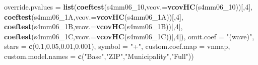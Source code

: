 \documentclass[
]{article}
\newenvironment{Shaded}{\begin{snugshade}}{\end{snugshade}}
\newcommand{\DataTypeTok}[1]{\textcolor[rgb]{0.13,0.29,0.53}{#1}}
\newcommand{\DecValTok}[1]{\textcolor[rgb]{0.00,0.00,0.81}{#1}}
\newcommand{\FloatTok}[1]{\textcolor[rgb]{0.00,0.00,0.81}{#1}}
\newcommand{\KeywordTok}[1]{\textcolor[rgb]{0.13,0.29,0.53}{\textbf{#1}}}
\newcommand{\NormalTok}[1]{#1}
\newcommand{\StringTok}[1]{\textcolor[rgb]{0.31,0.60,0.02}{#1}}
\begin{document}
\begin{Shaded}
\begin{Highlighting}[]
          \DataTypeTok{override.pvalues =} \KeywordTok{list}\NormalTok{(}\KeywordTok{coeftest}\NormalTok{(s4mm06_}\DecValTok{10}\NormalTok{,}\DataTypeTok{vcov.=}\KeywordTok{vcovHC}\NormalTok{(s4mm06_}\DecValTok{10}\NormalTok{))[,}\DecValTok{4}\NormalTok{],}
                                  \KeywordTok{coeftest}\NormalTok{(s4mm06_1A,}\DataTypeTok{vcov.=}\KeywordTok{vcovHC}\NormalTok{(s4mm06_1A))[,}\DecValTok{4}\NormalTok{],}
                                  \KeywordTok{coeftest}\NormalTok{(s4mm06_1B,}\DataTypeTok{vcov.=}\KeywordTok{vcovHC}\NormalTok{(s4mm06_1B))[,}\DecValTok{4}\NormalTok{],}
                                  \KeywordTok{coeftest}\NormalTok{(s4mm06_1C,}\DataTypeTok{vcov.=}\KeywordTok{vcovHC}\NormalTok{(s4mm06_1C))[,}\DecValTok{4}\NormalTok{]),}
          \DataTypeTok{omit.coef =} \StringTok{"(wave)"}\NormalTok{, }\DataTypeTok{stars =} \KeywordTok{c}\NormalTok{(}\FloatTok{0.1}\NormalTok{,}\FloatTok{0.05}\NormalTok{,}\FloatTok{0.01}\NormalTok{,}\FloatTok{0.001}\NormalTok{), }\DataTypeTok{symbol =} \StringTok{"+"}\NormalTok{,}
          \DataTypeTok{custom.coef.map =}\NormalTok{ vnmap, }
          \DataTypeTok{custom.model.names =} \KeywordTok{c}\NormalTok{(}\StringTok{"Base"}\NormalTok{,}\StringTok{"ZIP"}\NormalTok{,}\StringTok{"Municipality"}\NormalTok{,}\StringTok{"Full"}\NormalTok{))}
\end{Highlighting}
\end{Shaded}
\end{document}
